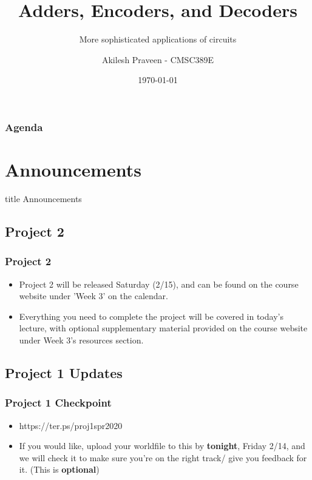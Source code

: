 \documentclass{beamer}
\title{Adders, Encoders, and Decoders}
\subtitle{More sophisticated applications of circuits}
\author[A Praveen]{Akilesh Praveen - CMSC389E}
\institute{UMD}
\date{\today}
\begin{document}
    \begin{frame}
        \titlepage
    \end{frame}
    
    \begin{frame}
        \frametitle{Agenda}
        \tableofcontents
    \end{frame}
    
    \section{Announcements}
    
        \begin{frame}
                \vfill
                \centering
                \begin{beamercolorbox}[sep=8pt,center,shadow=true,rounded=true]{title}
                    Announcements\par%
                \end{beamercolorbox}
                \vfill
             \end{frame}
    
        \subsection{Project 2}
        
            
            
            \begin{frame}
                \frametitle{Project 2}
                \begin{itemize}
                    \item Project 2 will be released Saturday (2/15), and can be found on the course website under 'Week 3' on the calendar.
                    \item Everything you need to complete the project will be covered in today's lecture, with optional supplementary material provided on the course website under Week 3's resources section.
                \end{itemize}
            \end{frame}
            
       \subsection{Project 1 Updates}
            
            \begin{frame}
                \frametitle{Project 1 Checkpoint}
                \begin{itemize}
                    \item https://ter.ps/proj1spr2020
                    \item If you would like, upload your worldfile to this by \textbf{tonight}, Friday 2/14, and we will check it to make sure you're on the right track/ give you feedback for it. (This is \textbf{optional})
                    
                \end{itemize}
            \end{frame}
            
\end{document}
